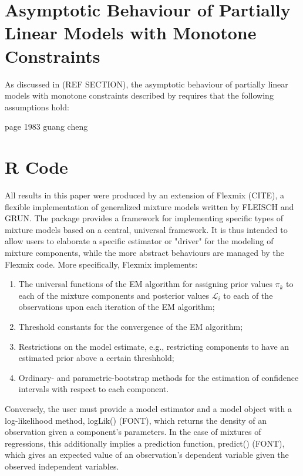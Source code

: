 \documentclass[10pt]{olplainarticle}\usepackage[]{graphicx}\usepackage[]{color}
\begin{document}
\begin{appendices}

\chapter{Asymptotic Behaviour of Partially Linear Models with Monotone Constraints} \label{abplmmc}

As discussed in (REF SECTION), the asymptotic behaviour of partially linear models with monotone constraints described by \cite{guangcheng} requires that the following assumptions hold:

page 1983 guang cheng

\chapter{R Code}


All results in this paper were produced by an extension of Flexmix (CITE), a flexible implementation of generalized mixture models written by FLEISCH and GRUN. The package provides a framework for implementing specific types of mixture models based on a central, universal framework. It is thus intended to allow users to elaborate a specific estimator or "driver" for the modeling of mixture components, while the more abstract behaviours are managed by the Flexmix code. More specifically, Flexmix implements:

\begin{enumerate}
  \item The universal functions of the EM algorithm for assigning prior values $\pi_k$ to each of the mixture components and posterior values $\mathcal{L}_i$ to each of the observations upon each iteration of the EM algorithm;
  \item Threshold constants for the convergence of the EM algorithm;
  \item Restrictions on the model estimate, e.g., restricting components to have an estimated prior above a certain threshhold;
  \item Ordinary- and parametric-bootstrap methods for the estimation of confidence intervals with respect to each component.
\end{enumerate}

Conversely, the user must provide a model estimator and a model object with a log-likelihood method, logLik() (FONT), which returns the density of an observation given a component's parameters. In the case of mixtures of regressions, this additionally implies a prediction function, predict() (FONT), which gives an expected value of an observation's dependent variable given the observed independent variables.


\end{appendices}
\end{document}
